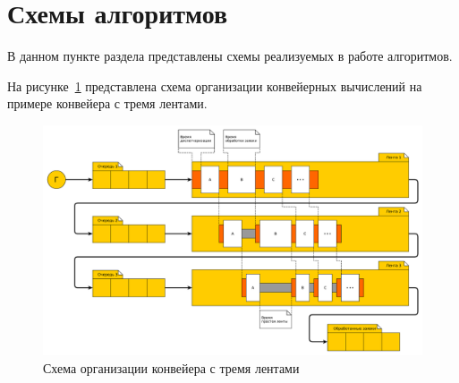 \documentclass[a4paper,oneside,14pt]{extreport}
\begin{document}
\section{Схемы алгоритмов}
В данном пункте раздела представлены схемы реализуемых в работе алгоритмов.

На рисунке~\ref{img:conveer} представлена схема организации конвейерных вычислений на примере конвейера с тремя лентами.
\begin{figure}[H]
	\centering
	\includegraphics[width=1.00\linewidth]{images/conveer}
	\caption{Схема организации конвейера с тремя лентами}
	\label{img:conveer}
\end{figure}
%
%
%
%
%
\end{document}

